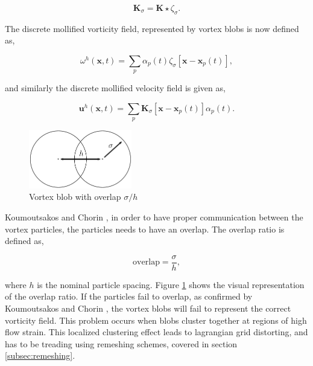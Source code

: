 	\begin{equation}
	\mathbf{K}_{\sigma} = \mathbf{K} \star \zeta_{\sigma}.
	\end{equation}

The discrete mollified vorticity field, represented by vortex blobs is now defined as,

	\begin{equation}
	\omega^h\left(\mathbf{x},t\right) = \sum_p \alpha_p\left(t\right)\zeta_{\sigma}\left[\mathbf{x}-\mathbf{x}_p\left(t\right)\right],
	\label{eq:mollifiedVorticityField}
	\end{equation}

and similarly the discrete mollified velocity field is given as,

	\begin{equation}
	\mathbf{u}^h\left(\mathbf{x},t\right) = \sum_p \mathbf{K}_{\sigma}\left[\mathbf{x}-\mathbf{x}_p\left(t\right)\right]\alpha_p\left(t\right).
	\end{equation}

	\begin{figure}[b]
	\centering
	\includegraphics[width=0.4\textwidth]{figures/lagrangian/blobOverlap.pdf}
	\caption{Vortex blob with overlap $\sigma/h$}
	\label{fig:blobOverlap}
	\end{figure}

Koumoutsakos and Chorin \cite{Cottet2000a}, in order to have proper communication between the vortex particles, the particles needs to have an overlap. The overlap ratio is defined as,

	\begin{equation}
	\mathrm{overlap} = \frac{\sigma}{h},
	\label{eq:overlapRatio}
	\end{equation}

where $h$ is the nominal particle spacing. Figure \ref{fig:blobOverlap} shows the visual representation of the overlap ratio. If the particles fail to overlap, as confirmed by Koumoutsakos and Chorin \cite{Cottet2000a}, the vortex blobs will fail to represent the correct vorticity field. This problem occurs when blobs cluster together at regions of high flow strain. This localized clustering effect leads to lagrangian grid distorting, and has to be treading using remeshing schemes, covered in section \ref{subsec:remeshing}.



